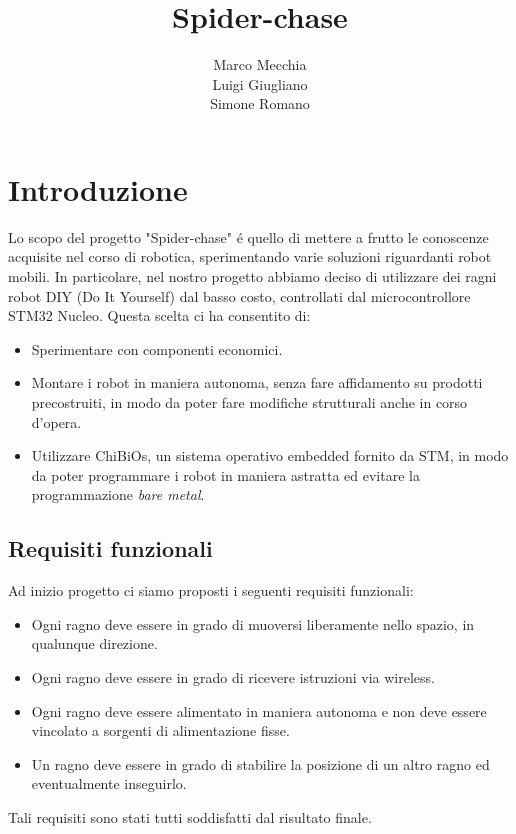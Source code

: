 \documentclass [11pt ,a4paper ,twoside ]{report}
\title{\textbf{Spider-chase}}
\author{Marco Mecchia\\
		Luigi Giugliano\\
		Simone Romano}
\date{}
\begin{document}
\maketitle

\tableofcontents

\cleardoublepage

\chapter{Introduzione}

Lo scopo del progetto "Spider-chase" \'e quello di mettere a frutto le conoscenze acquisite nel corso di robotica, sperimentando varie soluzioni riguardanti robot mobili. In particolare, nel nostro progetto abbiamo deciso di utilizzare dei ragni robot DIY (Do It Yourself) dal basso costo, controllati dal microcontrollore STM32 Nucleo. Questa scelta ci ha consentito di:

\begin{itemize}
\item Sperimentare con componenti economici.
\item Montare i robot in maniera autonoma, senza fare affidamento su prodotti precostruiti, in modo da poter fare modifiche strutturali anche in corso d'opera.
\item Utilizzare ChiBiOs, un sistema operativo embedded fornito da STM, in modo da poter programmare i robot in maniera astratta ed evitare la programmazione \textit{bare metal}.
\end{itemize}

\section{Requisiti funzionali}
Ad inizio progetto ci siamo proposti i seguenti requisiti funzionali:
\begin{itemize}
\item Ogni ragno deve essere in grado di muoversi liberamente nello spazio, in qualunque direzione.
\item Ogni ragno deve essere in grado di ricevere istruzioni via wireless.
\item Ogni ragno deve essere alimentato in maniera autonoma e non deve essere vincolato a sorgenti di alimentazione fisse.
\item Un ragno deve essere in grado di stabilire la posizione di un altro ragno ed eventualmente inseguirlo.
\end{itemize}

Tali requisiti sono stati tutti soddisfatti dal risultato finale.
\end{document}
